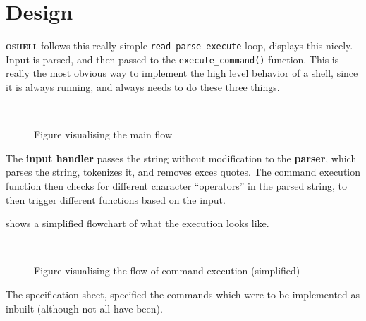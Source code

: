 \documentclass[12pt,english]{article}
\newcommand{\funcname}[1]{\texttt{#1()}\xspace} %
\newcommand{\projectname}{\textsc{oshell}}
\newcommand{\mycomment}[1]{}
\begin{document}
\section{Design}
\mycomment{
  \textbf{Checklist for design section}
\begin{itemize}
\item Maybe some high level explanation flow chart of everything
\item Go into detail with inbuilt commands and piping redirection \ldots
\item CHOOSE MOST COMPLEX/INTERESTING PART to go indepth, flow chart explanations \ldots, flow chart explanations \ldots
\item \textbf{Focus on the overall structure and flow of your program, rather than specific code details}
\end{itemize}

}

\textbf{\projectname} follows this really simple \texttt{read-parse-execute} loop, 
displays this nicely. Input
is parsed, and then passed to the \funcname{execute\_command} function. This is really the most obvious way to
implement the high level behavior of a shell, since it is always running, and always needs to do these three things.

\begin{figure}[!htb]
  \centering
  
  \caption{Figure visualising the main flow}~\label{fig:mainLoopFlowchart}
\end{figure}

The \textbf{input handler} passes the string without modification to the
\textbf{parser}, which parses the string, tokenizes it, and removes exces quotes.
The command execution function then checks for different character ``operators'' in the parsed string,
to then trigger different functions based on the input. 

 shows a
simplified flowchart of what the execution looks like.
\begin{figure}[!htb]
  \centering
  
  \caption{Figure visualising the flow of command execution (simplified)}~\label{fig:executeCommandFlowchart}
\end{figure}

The specification sheet, specified the commands which were to be implemented as inbuilt
(although not all have been).
\end{document}
